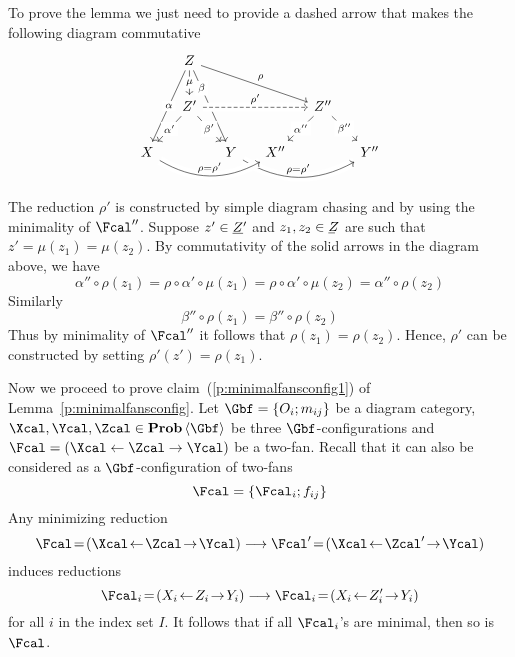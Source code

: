 \begin{Proof}
\begin{Proof}
    To prove the lemma we just need to provide a dashed arrow that makes the
    following diagram commutative
    \[
    \begin{tikzcd}[row sep=normal, column sep=small, ampersand replacement=\&]
      \mbox{}
      \&
      Z
      \arrow{d}[description]{\mu}
      \arrow{ddl}[description]{\alpha}
      \arrow{ddr}[description, near start]{\beta}
      \arrow{drrr}{\rho}
      \\
      \&
      Z'
      \arrow{dl}[description]{\alpha'}
      \arrow{dr}[description]{\beta'}
      \arrow[dashrightarrow, crossing over]{rrr}{\rho'}
      \&
      \&
      \&
      Z''
      \arrow{dl}[description]{\alpha''}
      \arrow{dr}[description]{\beta''}
      \\
      X
      \&
      \&
      Y
      \arrow[bend right, crossing over]{rrr}{\rho=\rho'}
      \&
      X''
      \arrow[bend left, leftarrow, crossing over]{lll}[swap]{\rho=\rho'}
      \&
      \&
      Y''
    \end{tikzcd}
    \]
    The reduction $\rho'$ is constructed by simple diagram chasing and by
    using the minimality of $\Fcal''$.  
    Suppose $z'\in \un {Z'}$ and $z_{1},z_{2}\in\un Z$ are such that
    $z' = \mu(z_{1})=\mu(z_{2})$. By commutativity of the solid arrows in the
    diagram above, we have 
    \[ 
    \alpha''\circ\rho(z_{1})
    =
    \rho\circ\alpha'\circ\mu(z_{1})
    =
    \rho\circ\alpha'\circ\mu(z_{2})
    =
    \alpha''\circ\rho(z_{2})
    \]
    Similarly
    \[
    \beta''\circ\rho(z_{1})
    =
    \beta''\circ\rho(z_{2})
    \]
    Thus by minimality of $\Fcal''$ it follows that
    $\rho(z_{1})=\rho(z_{2})$. Hence, $\rho'$ can be constructed by setting $\rho'(z') = \rho(z_1)$.
  \end{Proof}
  Now we proceed to prove claim~(\ref{p:minimalfansconfig1}) of
  Lemma~\ref{p:minimalfansconfig}. Let $\Gbf=\set{O_{i};m_{ij}}$ be a
  diagram category, $\Xcal,\Ycal,\Zcal\in\Prob\<\Gbf>$ be three
  $\Gbf$-configurations and  
  $\Fcal=(\Xcal\ot\Zcal\to\Ycal)$ be a two-fan.
  Recall that it can also be considered as a $\Gbf$-configuration of
  two-fans 
  \[
  \Fcal=\set{\Fcal_{i};f_{ij}}
  \]
  Any minimizing reduction
  \[
  \Fcal\!=\!(\Xcal\!\ot\!\Zcal\!\to\!\Ycal)
  \too
  \Fcal'\!=\!(\Xcal\!\ot\!\Zcal'\!\to\!\Ycal)
  \]
  induces reductions 
  \[
  \Fcal_{i}\!=\!(X_{i}\!\ot\! Z_{i}\!\to\! Y_{i})
  \too
  \Fcal_{i}\!=\!(X_{i}\!\ot\! Z_{i}'\!\to\! Y_{i})
  \]
  for all $i$ in the index set $I$.
  It follows that if all $\Fcal_{i}$'s are minimal, then so is
  $\Fcal$. 


\end{Proof}
